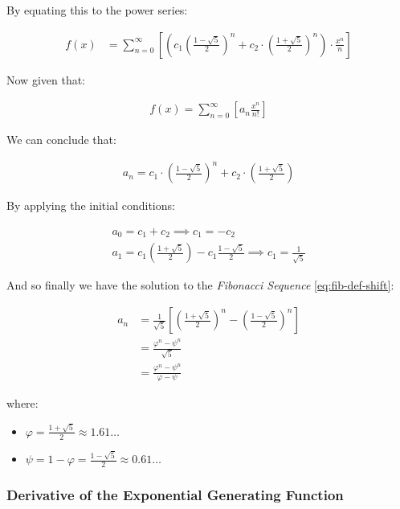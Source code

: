 \documentclass[11pt]{article}
\begin{document}
By equating this to the power series:


\begin{align*}
f\left( x \right)&= \sum^{\infty}_{n= 0}   \left[ \left( c_1\left( \frac{1- \sqrt{5} }{2} \right)^n +  c_2 \cdot  \left( \frac{1+ \sqrt{5} }{2} \right)^n \right) \cdot  \frac{x^n}{n} \right]
\end{align*}


Now given that:


\begin{align*}
f\left( x \right)= \sum^{\infty}_{n= 0}   \left[ a_n \frac{x^n}{n!} \right]
\end{align*}


We can conclude that:


\begin{align*}
a_n = c_1\cdot  \left( \frac{1- \sqrt{5} }{2} \right)^n +  c_2 \cdot  \left( \frac{1+  \sqrt{5} }{2} \right)
\end{align*}


By applying the initial conditions:


\begin{align*}
a_0= c_1 +  c_2  \implies  c_1= - c_2\\
a_1= c_1 \left( \frac{1+ \sqrt{5} }{2} \right) -  c_1 \frac{1-\sqrt{5} }{2}  \implies  c_1 = \frac{1}{\sqrt{5} }
\end{align*}


And so finally we have the solution to the \emph{Fibonacci Sequence} \ref{eq:fib-def-shift}:


\begin{align}
    a_n &= \frac{1}{\sqrt{5} } \left[ \left( \frac{1+  \sqrt{5} }{2}  \right)^n -  \left( \frac{1- \sqrt{5} }{2} \right)^n \right] \nonumber \\
&= \frac{\varphi^n - \psi^n}{\sqrt{5} } \nonumber\\
&=\frac{\varphi^n -  \psi^n}{\varphi - \psi} \label{eq:fib-sol}
\end{align}


where:

\begin{itemize}
\item \(\varphi = \frac{1+ \sqrt{5} }{2} \approx 1.61\ldots\)
\item \(\psi = 1-\varphi = \frac{1- \sqrt{5} }{2} \approx 0.61\ldots\)
\end{itemize}

\subsubsection{Derivative of the Exponential Generating Function}
\label{Derivative-exp-gen-function}
\end{document}
